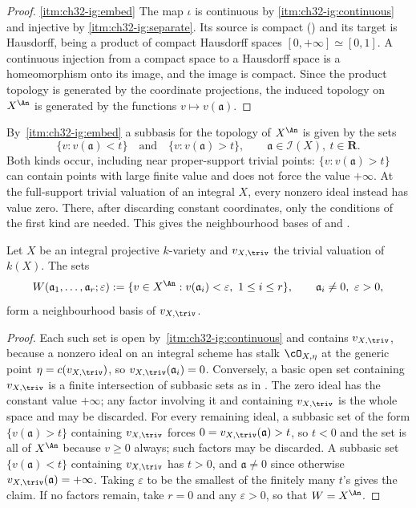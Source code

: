 \begin{proof}
\cref{itm:ch32-ig:embed}  The map $\iota$ is continuous by
\cref{itm:ch32-ig:continuous} and injective by \cref{itm:ch32-ig:separate}.
Its source is compact () and its target is
Hausdorff, being a product of compact Hausdorff spaces
$[0,+\infty]\simeq[0,1]$.  A continuous injection from a compact space to
a Hausdorff space is a homeomorphism onto its image, and the image is
compact.  Since the product topology is generated by the coordinate
projections, the induced topology on $X^{\An}$ is generated by the
functions $v\mapsto v(\mathfrak a)$.
\end{proof}

\begin{remark}
\label{rem:ch32-subbasis}
By \,\cref{itm:ch32-ig:embed} a subbasis for
the topology of $X^{\An}$ is given by the sets
\[
 \{v:v(\mathfrak a)<t\}\quad\text{and}\quad\{v:v(\mathfrak a)>t\},
 \qquad \mathfrak a\in\mathcal I(X),\ t\in\mathbf R .
\]
Both kinds occur, including near proper-support trivial points:
$\{v:v(\mathfrak a)>t\}$ can contain points with large finite value and
does not force the value $+\infty$.  At the full-support trivial valuation
of an integral $X$, every nonzero ideal instead has value zero.  There,
after discarding constant coordinates, only the conditions of the first
kind are needed.  This gives the neighbourhood bases of
 and
.
\end{remark}

\begin{lemma}
\label{lem:ch32-neighbourhood-basis-triv}
Let $X$ be an integral projective $k$-variety and $v_{X,\triv}$ the
trivial valuation of $k(X)$.  The sets
\[
 W(\mathfrak a_1,\ldots,\mathfrak a_r;\varepsilon)
 :=\{v\in X^{\An}:v(\mathfrak a_i)<\varepsilon,\ 1\leq i\leq r\},
 \qquad \mathfrak a_i\neq0,\ \varepsilon>0,
\]
form a neighbourhood basis of $v_{X,\triv}$.
\end{lemma}

\begin{proof}
Each such set is open by
\,\cref{itm:ch32-ig:continuous} and contains
$v_{X,\triv}$, because a nonzero ideal on an integral scheme has stalk
$\cO_{X,\eta}$ at the generic point $\eta=c(v_{X,\triv})$, so
$v_{X,\triv}(\mathfrak a_i)=0$.  Conversely, a basic open set containing
$v_{X,\triv}$ is a finite intersection of subbasic sets as in
.  The zero ideal has the constant value $+\infty$; any factor involving
it and containing $v_{X,\triv}$ is the whole space and may be discarded.
For every remaining ideal, a subbasic set of the form
$\{v(\mathfrak a)>t\}$ containing $v_{X,\triv}$ forces
$0=v_{X,\triv}(\mathfrak a)>t$, so $t<0$ and the set is all of
$X^{\An}$ because $v\geq0$ always; such factors may be discarded.  A
subbasic set $\{v(\mathfrak a)<t\}$ containing $v_{X,\triv}$ has
$t>0$, and $\mathfrak a\neq0$ since otherwise
$v_{X,\triv}(\mathfrak a)=+\infty$.  Taking $\varepsilon$ to be the
smallest of the finitely many $t$'s gives the claim.  If no factors
remain, take $r=0$ and any $\varepsilon>0$, so that $W=X^{\An}$.
\end{proof}

